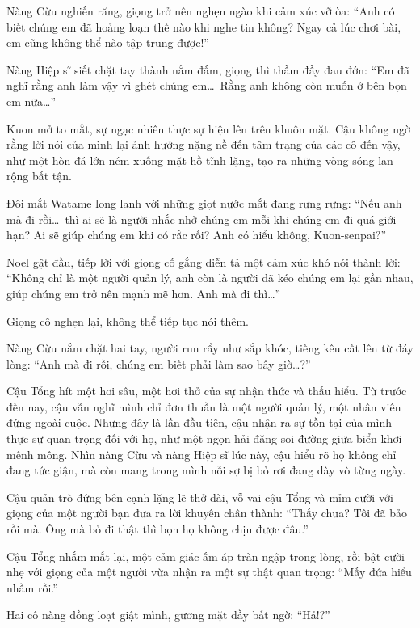 \documentclass[../main.tex]{subfiles}
\begin{document}
Nàng Cừu nghiến răng, giọng trở nên nghẹn ngào khi cảm xúc vỡ òa: ``Anh có biết chúng em đã hoảng loạn thế nào khi nghe tin không? Ngay cả lúc chơi bài, em cũng không thể nào tập trung được!''

Nàng Hiệp sĩ siết chặt tay thành nắm đấm, giọng thì thầm đầy đau đớn: ``Em đã nghĩ rằng anh làm vậy vì ghét chúng em\dots\ Rằng anh không còn muốn ở bên bọn em nữa\dots''

Kuon mở to mắt, sự ngạc nhiên thực sự hiện lên trên khuôn mặt. Cậu không ngờ rằng lời nói của mình lại ảnh hưởng nặng nề đến tâm trạng của các cô đến vậy, như một hòn đá lớn ném xuống mặt hồ tĩnh lặng, tạo ra những vòng sóng lan rộng bất tận.

Đôi mắt Watame long lanh với những giọt nước mắt đang rưng rưng: ``Nếu anh mà đi rồi\dots\ thì ai sẽ là người nhắc nhở chúng em mỗi khi chúng em đi quá giới hạn? Ai sẽ giúp chúng em khi có rắc rối? Anh có hiểu không, Kuon-senpai?''

Noel gật đầu, tiếp lời với giọng cố gắng diễn tả một cảm xúc khó nói thành lời: ``Không chỉ là một người quản lý, anh còn là người đã kéo chúng em lại gần nhau, giúp chúng em trở nên mạnh mẽ hơn. Anh mà đi thì\dots''

Giọng cô nghẹn lại, không thể tiếp tục nói thêm.

Nàng Cừu nắm chặt hai tay, người run rẩy như sắp khóc, tiếng kêu cất lên từ đáy lòng: ``Anh mà đi rồi, chúng em biết phải làm sao bây giờ\dots?''

Cậu Tổng hít một hơi sâu, một hơi thở của sự nhận thức và thấu hiểu. Từ trước đến nay, cậu vẫn nghĩ mình chỉ đơn thuần là một người quản lý, một nhân viên đứng ngoài cuộc. Nhưng đây là lần đầu tiên, cậu nhận ra sự tồn tại của mình thực sự quan trọng đối với họ, như một ngọn hải đăng soi đường giữa biển khơi mênh mông. Nhìn nàng Cừu và nàng Hiệp sĩ lúc này, cậu hiểu rõ họ không chỉ đang tức giận, mà còn mang trong mình nỗi sợ bị bỏ rơi đang dày vò từng ngày.

Cậu quản trò đứng bên cạnh lặng lẽ thở dài, vỗ vai cậu Tổng và mỉm cười với giọng của một người bạn đưa ra lời khuyên chân thành: ``Thấy chưa? Tôi đã bảo rồi mà. Ông mà bỏ đi thật thì bọn họ không chịu được đâu.''

Cậu Tổng nhắm mắt lại, một cảm giác ấm áp tràn ngập trong lòng, rồi bật cười nhẹ với giọng của một người vừa nhận ra một sự thật quan trọng: ``Mấy đứa hiểu nhầm rồi.''

Hai cô nàng đồng loạt giật mình, gương mặt đầy bất ngờ: ``Hả!?''
\end{document}
